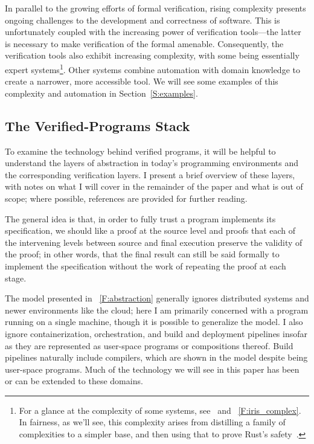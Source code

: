 In parallel to the growing efforts of formal verification, rising complexity
presents ongoing challenges to the development and correctness of software. This
is unfortunately coupled with the increasing power of verification tools---the
latter is necessary to make verification of the formal amenable. Consequently,
the verification tools also exhibit increasing complexity, with some being
essentially expert systems\footnote{For a glance at the complexity of some
systems, see~\cite{Jung_2015,Jung_2016,Krebbers_2017a,Jung_2018b} and
\figurename~\ref{F:iris_complex}. In fairness, as we'll see, this complexity
arises from distilling a family of complexities to a simpler base, and then
using that to prove Rust's safety~\cite{Jung_2018a}.}. Other systems combine
automation with domain knowledge to create a narrower, more accessible tool. We
will see some examples of this complexity and automation in
Section~\ref{S:examples}.

\subsection{The Verified-Programs Stack}

To examine the technology behind verified programs, it will be helpful to
understand the layers of abstraction in today's programming environments and the
corresponding verification layers. I present a brief overview of these layers,
with notes on what I will cover in the remainder of the paper and what is out of
scope; where possible, references are provided for further reading.

The general idea is that, in order to fully trust a program implements its
specification, we should like a proof at the source level and proofs that each
of the intervening levels between source and final execution preserve the
validity of the proof; in other words, that the final result can still be said
formally to implement the specification without the work of repeating the proof
at each stage.

The model presented in \figurename~\ref{F:abstraction} generally ignores
distributed systems and newer environments like the cloud; here I am primarily
concerned with a program running on a single machine, though it is possible to
generalize the model. I also ignore containerization, orchestration, and build
and deployment pipelines insofar as they are represented as user-space programs
or compositions thereof. Build pipelines naturally include compilers, which are
shown in the model despite being user-space programs. Much of the technology we
will see in this paper has been or can be extended to these domains.


